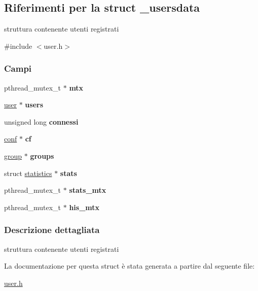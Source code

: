 \hypertarget{struct__usersdata}{}\subsection{Riferimenti per la struct \+\_\+usersdata}
\label{struct__usersdata}


struttura contenente utenti registrati  




{\ttfamily \#include $<$user.\+h$>$}

\subsubsection*{Campi}
\begin{DoxyCompactItemize}
\item 
\mbox{\label{struct__usersdata_ad4a8d3e0f3a4790c6751938aa507df25}} 
pthread\+\_\+mutex\+\_\+t $\ast$ {\bfseries mtx}
\item 
\mbox{\label{struct__usersdata_ad5cdd12902a8aed6a886c08d98876a1e}} 
\mbox{\hyperlink{struct__user}{user}} $\ast$ {\bfseries users}
\item 
\mbox{\label{struct__usersdata_a73741008fa5476371bf759051c7ed063}} 
unsigned long {\bfseries connessi}
\item 
\mbox{\label{struct__usersdata_a359cbd9e1d4b657f0525fffbe3f32c2e}} 
\mbox{\hyperlink{structconf}{conf}} $\ast$ {\bfseries cf}
\item 
\mbox{\label{struct__usersdata_a268e906ac965421b4dd21c9f9fcf9292}} 
\mbox{\hyperlink{struct__group}{group}} $\ast$ {\bfseries groups}
\item 
\mbox{\label{struct__usersdata_a798bb3c75234dde12a299fae106ad0dc}} 
struct \mbox{\hyperlink{structstatistics}{statistics}} $\ast$ {\bfseries stats}
\item 
\mbox{\label{struct__usersdata_a5f1b37c9a96925ca8851cdf0a4ceb9fa}} 
pthread\+\_\+mutex\+\_\+t $\ast$ {\bfseries stats\+\_\+mtx}
\item 
\mbox{\label{struct__usersdata_a286387bd54b1e7c4b38003f1c22e620d}} 
pthread\+\_\+mutex\+\_\+t $\ast$ {\bfseries his\+\_\+mtx}
\end{DoxyCompactItemize}


\subsubsection{Descrizione dettagliata}
struttura contenente utenti registrati 

La documentazione per questa struct è stata generata a partire dal seguente file\+:\begin{DoxyCompactItemize}
\item 
\mbox{\hyperlink{user_8h}{user.\+h}}\end{DoxyCompactItemize}
